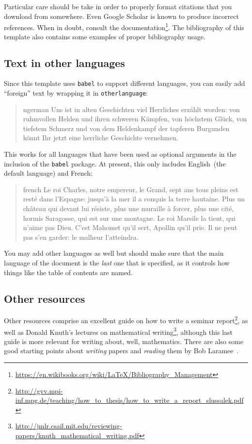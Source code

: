 Particular care should be take in order to properly format citations
that you download from somewhere. Even Google Scholar is known to
produce incorrect references.
%
When in doubt, consult the
documentation\footnote{\url{https://en.wikibooks.org/wiki/LaTeX/Bibliography_Management}}.
The bibliography of this template also contains some examples of proper
bibliography usage.

\subsection{Text in other languages}

Since this template uses \verb|babel| to support different languages, you can easily add ``foreign'' text by wrapping it in \verb|otherlanguage|:
%
\begin{quote}
  \begin{otherlanguage*}{ngerman}
    Uns ist in alten Geschichten viel Herrliches erzählt worden:
    von ruhmvollen Helden und ihren schweren Kämpfen, von
    höchstem Glück, von tiefstem Schmerz und von dem Heldenkampf
    der tapferen Burgunden könnt Ihr jetzt eine herrliche
    Geschichte vernehmen.
  \end{otherlanguage*}
\end{quote}
%
This works for all languages that have been used as optional arguments
in the inclusion of the \verb|babel| package. At present, this only
includes English~(the default language) and French:
%
\begin{quote}
  \begin{otherlanguage*}{french}
    Le roi Charles, notre empereur, le Grand, sept ans tous pleins
    est resté dans l'Espagne: jusqu'à la mer il a conquis la terre
    hautaine. Plus un château qui devant lui résiste, plus une muraille
    à forcer, plus une cité, hormis Saragosse, qui est sur une
    montagne. Le roi Marsile la tient, qui n'aime pas Dieu. C'est
    Mahomet qu'il sert, Apollin qu'il prie. Il ne peut pas s'en garder:
    le malheur l'atteindra. 
  \end{otherlanguage*}
\end{quote}
%
You may add other languages as well but should make sure that the main
language of the document is the \emph{last} one that is specified, as it
controls how things like the table of contents are named.

\subsection{Other resources}

Other resources comprise an excellent guide on how to write a seminar
report\footnote{\url{http://gvv.mpi-inf.mpg.de/teaching/how_to_thesis/how_to_write_a_report_slussalek.pdf}},
as well as Donald Knuth's lectures on mathematical
writing\footnote{\url{http://jmlr.csail.mit.edu/reviewing-papers/knuth_mathematical_writing.pdf}},
although this last guide is more relevant for writing about, well,
mathematics. There are also some good starting points about
\emph{writing} papers and \emph{reading} them by Bob
Laramee~\autocites{Laramee10,Laramee11}.
